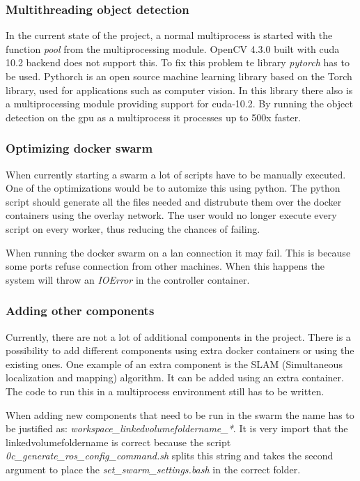 \subsubsection{Multithreading object detection}

In the current state of the project, a normal multiprocess is started with the function \textit{pool} from 
the multiprocessing module. OpenCV 4.3.0 built with \acs{cuda} 10.2 backend does not support this. To fix this problem
te library \textit{pytorch} has to be used. Pythorch is an open source machine learning library based on the 
Torch library, used for applications such as computer vision. In this library there also is a multiprocessing module
providing support for \acs{cuda}-10.2. By running the object detection on the \acs{gpu} as a multiprocess it processes up to 500x faster.

\subsubsection{Optimizing docker swarm}

When currently starting a swarm a lot of scripts have to be manually executed. One of the optimizations would be to automize this using 
python. The python script should generate all the files needed and distrubute them over the docker containers using the overlay network. 
The user would no longer execute every script on every worker, thus reducing the chances of failing.

When running the docker swarm on a \acs{lan} connection it may fail. This is because some ports refuse connection 
from other machines. When this happens the system will throw an \textit{IOError} in the controller container.

\subsubsection{Adding other components}

Currently, there are not a lot of additional components in the project. There is a possibility
to add different components using extra docker containers or using the existing ones. One
example of an extra component is the SLAM (Simultaneous localization and mapping)
algorithm. It can be added using an extra container. The code to run this in a multiprocess
environment still has to be written.

When adding new components that need to be run in the swarm the name has to be justified as: \textit{workspace\_linkedvolumefoldername\_*}.
It is very import that the linkedvolumefoldername is correct because the script \textit{0c\_generate\_ros\_config\_command.sh} splits this string and 
takes the second argument to place the  \textit{set\_swarm\_settings.bash} in the correct folder.

